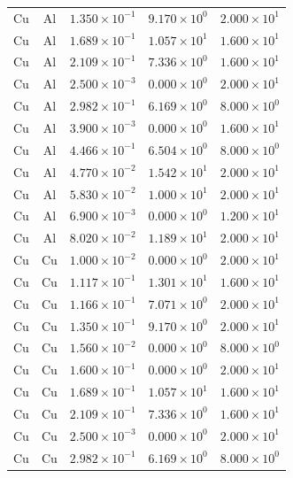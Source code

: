 \documentclass{article}
\begin{document}
\begin{longtable}{ccccc}
Cu &  Al & $1.350 \times 10^{-1}$ & $9.170 \times 10^{0}$ & $2.000 \times 10^{1}$ \\
Cu &  Al & $1.689 \times 10^{-1}$ & $1.057 \times 10^{1}$ & $1.600 \times 10^{1}$ \\
Cu &  Al & $2.109 \times 10^{-1}$ & $7.336 \times 10^{0}$ & $1.600 \times 10^{1}$ \\
Cu &  Al & $2.500 \times 10^{-3}$ & $0.000 \times 10^{0}$ & $2.000 \times 10^{1}$ \\
Cu &  Al & $2.982 \times 10^{-1}$ & $6.169 \times 10^{0}$ & $8.000 \times 10^{0}$ \\
Cu &  Al & $3.900 \times 10^{-3}$ & $0.000 \times 10^{0}$ & $1.600 \times 10^{1}$ \\
Cu &  Al & $4.466 \times 10^{-1}$ & $6.504 \times 10^{0}$ & $8.000 \times 10^{0}$ \\
Cu &  Al & $4.770 \times 10^{-2}$ & $1.542 \times 10^{1}$ & $2.000 \times 10^{1}$ \\
Cu &  Al & $5.830 \times 10^{-2}$ & $1.000 \times 10^{1}$ & $2.000 \times 10^{1}$ \\
Cu &  Al & $6.900 \times 10^{-3}$ & $0.000 \times 10^{0}$ & $1.200 \times 10^{1}$ \\
Cu &  Al & $8.020 \times 10^{-2}$ & $1.189 \times 10^{1}$ & $2.000 \times 10^{1}$ \\
Cu &  Cu & $1.000 \times 10^{-2}$ & $0.000 \times 10^{0}$ & $2.000 \times 10^{1}$ \\
Cu &  Cu & $1.117 \times 10^{-1}$ & $1.301 \times 10^{1}$ & $1.600 \times 10^{1}$ \\
Cu &  Cu & $1.166 \times 10^{-1}$ & $7.071 \times 10^{0}$ & $2.000 \times 10^{1}$ \\
Cu &  Cu & $1.350 \times 10^{-1}$ & $9.170 \times 10^{0}$ & $2.000 \times 10^{1}$ \\
Cu &  Cu & $1.560 \times 10^{-2}$ & $0.000 \times 10^{0}$ & $8.000 \times 10^{0}$ \\
Cu &  Cu & $1.600 \times 10^{-1}$ & $0.000 \times 10^{0}$ & $2.000 \times 10^{1}$ \\
Cu &  Cu & $1.689 \times 10^{-1}$ & $1.057 \times 10^{1}$ & $1.600 \times 10^{1}$ \\
Cu &  Cu & $2.109 \times 10^{-1}$ & $7.336 \times 10^{0}$ & $1.600 \times 10^{1}$ \\
Cu &  Cu & $2.500 \times 10^{-3}$ & $0.000 \times 10^{0}$ & $2.000 \times 10^{1}$ \\
Cu &  Cu & $2.982 \times 10^{-1}$ & $6.169 \times 10^{0}$ & $8.000 \times 10^{0}$ \\

\end{longtable}
\end{document}

